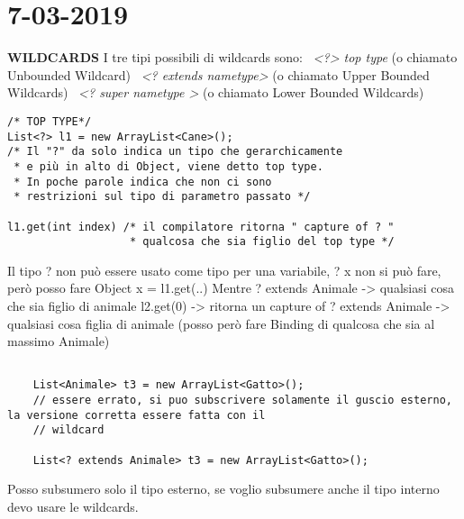 

\newpage
\section{7-03-2019}
\textbf{WILDCARDS} \newline
I tre tipi possibili di wildcards sono: \newline
\textbullet\ \textit{<?> top type} (o chiamato Unbounded Wildcard) \newline
\textbullet\ \textit{<? extends nametype>} (o chiamato Upper Bounded Wildcards)\newline
\textbullet\ \textit{<? super nametype >} (o chiamato Lower Bounded Wildcards)\newline



\begin{lstlisting}[basicstyle=\small,]
/* TOP TYPE*/ 
List<?> l1 = new ArrayList<Cane>();
/* Il "?" da solo indica un tipo che gerarchicamente
 * e più in alto di Object, viene detto top type.
 * In poche parole indica che non ci sono 
 * restrizioni sul tipo di parametro passato */

l1.get(int index) /* il compilatore ritorna " capture of ? " 
				   * qualcosa che sia figlio del top type */
\end{lstlisting}

\noindent Il tipo ? non può essere usato come tipo per una variabile, ? x non si può fare, però posso fare
Object x = l1.get(..) \newline
Mentre ? extends Animale -> qualsiasi cosa che sia figlio di animale \newline
l2.get(0) -> ritorna un capture of ? extends Animale -> qualsiasi cosa figlia di animale (posso però fare Binding di qualcosa che sia al massimo Animale) \newline

\begin{lstlisting}[basicstyle=\small,]

	List<Animale> t3 = new ArrayList<Gatto>();
	// essere errato, si puo subscrivere solamente il guscio esterno, la versione corretta essere fatta con il 
	// wildcard
	
	List<? extends Animale> t3 = new ArrayList<Gatto>();

\end{lstlisting}

\noindent Posso subsumero solo il tipo esterno, se voglio subsumere anche il tipo interno devo usare le wildcards. \newline

